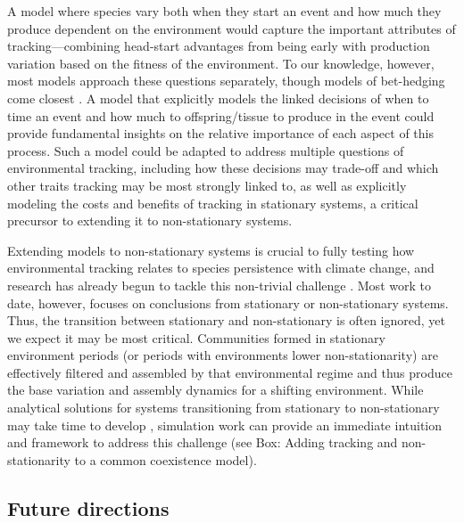\documentclass[11pt,letterpaper]{article}
\newcommand{\R}[1]{\label{#1}\linelabel{#1}}
\begin{document}
A model where species vary both when they start an event and how much they produce dependent on the environment would capture the important attributes of tracking---combining head-start advantages from being early with production variation based on the fitness of the environment. To our knowledge, however, most models approach these questions separately, though models of bet-hedging come closest \citep{Gourbiere2009,tufto2015}. A model that explicitly models the linked decisions of when to time an event and how much to offspring/tissue to produce in the event could provide fundamental insights on the relative importance of each aspect of this process. Such a model could be adapted to address multiple questions of environmental tracking, including how these decisions may trade-off and which other traits tracking may be most strongly linked to, as well as explicitly modeling the costs and benefits of tracking in stationary systems, \R{modelcosts2} a critical precursor to extending it to non-stationary systems. 

Extending models to non-stationary systems is crucial to fully testing how environmental tracking relates to species persistence with climate change, and research has already begun to tackle this non-trivial challenge \citep{chessonnonstat,legault2019,volkerass}. Most work to date, however, focuses on conclusions from stationary or non-stationary systems. Thus, the transition between stationary and non-stationary is often ignored, yet we expect it may be most critical. Communities formed in stationary environment periods (or periods with environments lower non-stationarity) are effectively filtered and assembled by that environmental regime and thus produce the base variation and assembly dynamics for a shifting environment. While analytical solutions for systems transitioning from stationary to non-stationary may take time to develop \citep{chessonnonstat}, simulation work can provide an immediate intuition and framework to address this challenge (see Box: Adding tracking and non-stationarity to a common coexistence model). \R{sectionmutisppend}

\subsection{Future directions}
\end{document}
